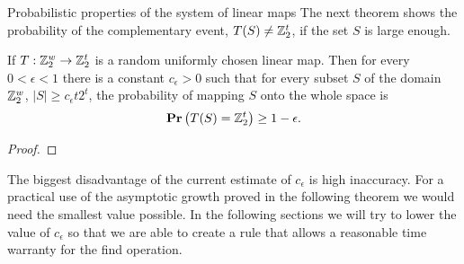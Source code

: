 \begin{section}{Probabilistic properties of the system of linear maps}
The next theorem shows the probability of the complementary event, $T(S) \neq \mathbb{Z}_{2}^{t}$, if the set $S$ is large enough.
\begin{theorem}
\label{theorem-set-onto-by-linear-transform}
If $T: \mathbb{Z}_{2}^{w} \rightarrow \mathbb{Z}_{2}^{t}$ is a random uniformly chosen linear map. Then for every $0 < \epsilon < 1$ there is a constant $c_\epsilon > 0$ such that for every subset $S$ of the domain $\mathbb{Z}_{2}^{w}$, $|S| \geq c_\epsilon t 2^t$, the probability of mapping $S$ onto the whole space is
\[
	\mathbf{Pr}\left(T(S) = \mathbb{Z}_{2}^{t}\right) \geq 1 - \epsilon \text{.}
\]
\end{theorem}
\begin{proof}

\end{proof}

The biggest disadvantage of the current estimate of $c_\epsilon$ is high inaccuracy. For a practical use of the asymptotic growth proved in the following theorem we would need the smallest value possible. In the following sections we will try to lower the value of $c_\epsilon$ so that we are able to create a rule that allows a reasonable time warranty for the find operation.
\end{section}
